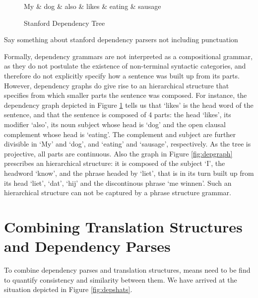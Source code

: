 \documentclass{report}
\begin{document}
\begin{figure}[!h]\label{fig:deptree1}
\centering
\begin{dependency}[theme=simple]%
\begin{deptext}[column sep=.5cm, row sep=.1ex]
My \& dog \& also \& likes \& eating \& sausage \\
\end{deptext}
\end{dependency}
\caption{Stanford Dependency Tree}
\end{figure}

Say something about stanford dependency parsers not including punctuation


Formally, dependency grammars are not interpreted as a compositional grammar, as they do not postulate the existence of non-terminal syntactic categories, and therefore do not explicitly specify how a sentence was built up from its parts. However, dependency graphs do give rise to an hierarchical structure that specifies from which smaller parts the sentence was composed. For instance, the dependency graph depicted in Figure \ref{fig:deptree1} tells us that `likes' is the head word of the sentence, and that the sentence is composed of 4 parts: the head `likes', its modifier `also', its noun subject whose head is `dog' and the open clausal complement whose head is `eating'. The complement and subject are further divisible in `My' and `dog', and `eating' and `sausage', respectively. As the tree is projective, all parts are continuous. Also the graph in Figure \ref{fig:depgraph} prescribes an hierarchical structure: it is composed of the subject `I', the headword `know', and the phrase headed by `liet', that is in its turn built up from its head `liet', `dat', `hij' and the discontinous phrase `me winnen'. Such an hierarchical structure can not be captured by a phrase structure grammar.

\section{Combining Translation Structures and Dependency Parses}

To combine dependency parses and translation structures, means need to be find to quantify consistency and similarity between them. We have arrived at the situation depicted in Figure \ref{fig:depshats}.
\end{document}
